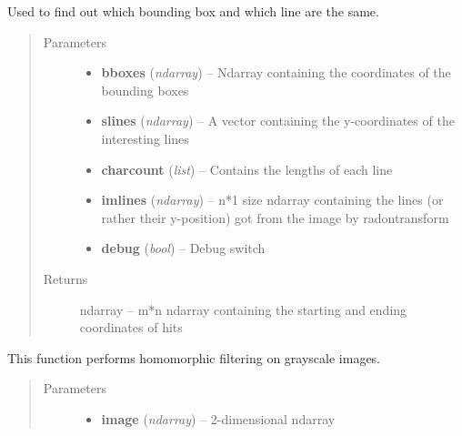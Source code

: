 \documentclass[letterpaper,10pt,english]{sphinxmanual}
\begin{document}
\begin{fulllineitems}
\begin{fulllineitems}
\end{fulllineitems}


\begin{fulllineitems}
\label{code:OratUtils.OratUtils.findCorr}
Used to find out which bounding box and which line are the same.
\begin{quote}\begin{description}
\item[{Parameters}] \leavevmode\begin{itemize}
\item {} 
\textbf{bboxes} (\emph{ndarray}) -- Ndarray containing the coordinates of the bounding boxes

\item {} 
\textbf{slines} (\emph{ndarray}) -- A vector containing the y-coordinates of the interesting lines

\item {} 
\textbf{charcount} (\emph{list}) -- Contains the lengths of each line

\item {} 
\textbf{imlines} (\emph{ndarray}) -- n*1 size ndarray containing the lines (or rather their y-position) got from the image by radontransform

\item {} 
\textbf{debug} (\emph{bool}) -- Debug switch

\end{itemize}

\item[{Returns}] \leavevmode
ndarray -- m*n ndarray containing the starting and ending coordinates of hits

\end{description}\end{quote}

\end{fulllineitems}


\begin{fulllineitems}
\label{code:OratUtils.OratUtils.hfilter}
This function performs homomorphic filtering on grayscale images.
\begin{quote}\begin{description}
\item[{Parameters}] \leavevmode\begin{itemize}
\item {} 
\textbf{image} (\emph{ndarray}) -- 2-dimensional ndarray


\end{itemize}
\end{description}
\end{quote}
\end{fulllineitems}
\end{fulllineitems}
\end{document}
